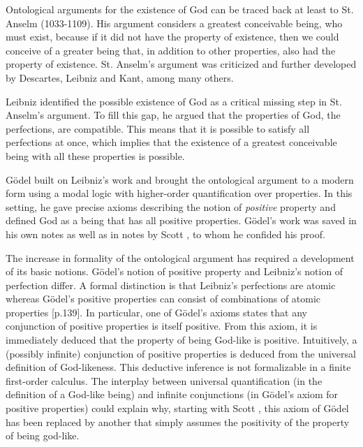 \documentclass[smallextended]{svjour3}
\begin{document}
Ontological arguments for the existence of God can be traced back at least to St. Anselm (1033-1109). His argument considers a greatest conceivable being, who must exist, because if it did not have the property of existence, then we could conceive of a greater being that, in addition to other properties, also had the property of existence. St. Anselm's argument was criticized and further developed by Descartes, Leibniz and Kant, among many others. 

Leibniz identified the possible existence of God as a critical missing step in St. Anselm's argument. To fill this gap, he argued that the properties of God, the perfections, are compatible. This means that it is possible to satisfy all perfections at once, which implies that the existence of a greatest conceivable being with all these properties is possible. 

G\"odel built on Leibniz's work \citep{adams} and brought the ontological argument to a modern form using a modal logic with higher-order quantification over properties. In this setting, he gave precise axioms describing the notion of \emph{positive} property and defined God as a being that has all positive properties. G\"odel's work was saved in his own notes \citep{Goedel} as well as in notes by Scott \citep{scott}, to whom he confided his proof. 

The increase in formality of the ontological argument has required a development of its basic notions. G\"odel's notion of positive property and Leibniz's notion of perfection differ. A formal distinction is that Leibniz's perfections are atomic whereas G\"odel's positive properties can consist of combinations of atomic properties \citep{fitting}[p.139]. In particular, one of G\"odel's axioms states that any conjunction of positive properties is itself positive. From this axiom, it is immediately deduced that the property of being God-like is positive. Intuitively, a (possibly infinite) conjunction of positive properties is deduced from the universal definition of God-likeness. This deductive inference is not formalizable in a finite first-order calculus. The interplay between universal quantification (in the definition of a God-like being) and infinite conjunctions (in G\"odel's axiom for positive properties) could explain why, starting with Scott \citep{scott}, this axiom of G\"odel has been replaced by another that simply assumes the positivity of the property of being god-like. 
\end{document}
